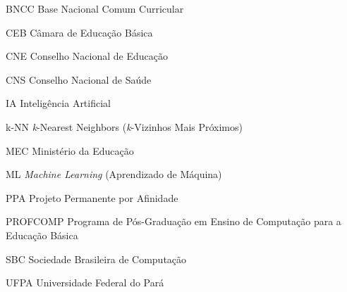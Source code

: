 
\renewcommand{\listtablename}{Lista de tabelas}
\listoftables*
\cleardoublepage
  
\begin{siglas} 
  \item [BNCC] 		 Base Nacional Comum Curricular
  \item [CEB] 		 Câmara de Educação Básica
  \item [CNE] 		 Conselho Nacional de Educação
  \item [CNS] 		 Conselho Nacional de Saúde
  \item [IA] 		 Inteligência Artificial
  \item [k-NN] 		 \textit{k}-Nearest Neighbors (\textit{k}-Vizinhos Mais Próximos)
  \item [MEC] 		 Ministério da Educação
  \item [ML] 		 \textit{Machine Learning} (Aprendizado de Máquina)
  \item [PPA] 		 Projeto Permanente por Afinidade
  \item [PROFCOMP] 	 Programa de Pós-Graduação em Ensino de Computação para a Educação Básica
  \item [SBC] 		 Sociedade Brasileira de Computação
  \item [UFPA] 	 	 Universidade Federal do Pará      
\end{siglas}
